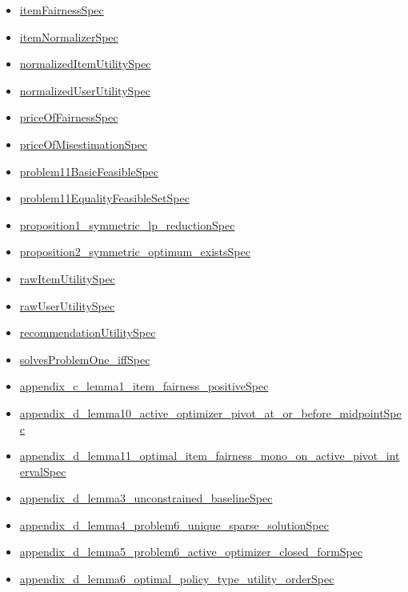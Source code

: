 \documentclass[10pt]{article}
\begin{document}
\begin{itemize}[leftmargin=1.2em]
\begin{itemize}[leftmargin=1.2em]
\item \hyperlink{source-claim-9df044aa943faf07}{itemFairnessSpec}
\item \hyperlink{source-claim-0efedb08b89098c8}{itemNormalizerSpec}
\item \hyperlink{source-claim-8a9fd6e3ecb98f56}{normalizedItemUtilitySpec}
\item \hyperlink{source-claim-695e539b33a12ace}{normalizedUserUtilitySpec}
\item \hyperlink{source-claim-0dabf0e6dbbf52bf}{priceOfFairnessSpec}
\item \hyperlink{source-claim-0b68590619af089c}{priceOfMisestimationSpec}
\item \hyperlink{source-claim-326f5e510283a532}{problem11BasicFeasibleSpec}
\item \hyperlink{source-claim-41e201d4ec448012}{problem11EqualityFeasibleSetSpec}
\item \hyperlink{source-claim-2d18213881f27a07}{proposition1\_symmetric\_lp\_reductionSpec}
\item \hyperlink{source-claim-886aec0cf4d20216}{proposition2\_symmetric\_optimum\_existsSpec}
\item \hyperlink{source-claim-fe2438fd53f645e4}{rawItemUtilitySpec}
\item \hyperlink{source-claim-9ef94f4afd2b61ac}{rawUserUtilitySpec}
\item \hyperlink{source-claim-9f0be6e1ade7a30d}{recommendationUtilitySpec}
\item \hyperlink{source-claim-0b16a4458c32b7d8}{solvesProblemOne\_iffSpec}
\item \hyperlink{source-claim-9c3a977985663e10}{appendix\_c\_lemma1\_item\_fairness\_positiveSpec}
\item \hyperlink{source-claim-d461c27ad08b8393}{appendix\_d\_lemma10\_active\_optimizer\_pivot\_at\_or\_before\_midpointSpec}
\item \hyperlink{source-claim-9a6a42e2321f37e9}{appendix\_d\_lemma11\_optimal\_item\_fairness\_mono\_on\_active\_pivot\_intervalSpec}
\item \hyperlink{source-claim-2174fb755f649010}{appendix\_d\_lemma3\_unconstrained\_baselineSpec}
\item \hyperlink{source-claim-bdf6b6ab56cd5fdc}{appendix\_d\_lemma4\_problem6\_unique\_sparse\_solutionSpec}
\item \hyperlink{source-claim-725d3169ac365914}{appendix\_d\_lemma5\_problem6\_active\_optimizer\_closed\_formSpec}
\item \hyperlink{source-claim-d98bc9bd5bb82720}{appendix\_d\_lemma6\_optimal\_policy\_type\_utility\_orderSpec}

\end{itemize}
\end{itemize}
\end{document}
